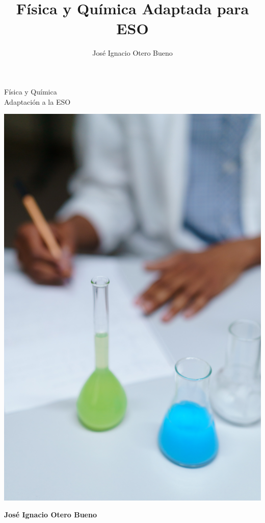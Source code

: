 \documentclass[12pt]{book}
\title{Física y Química Adaptada para ESO}
\author{José Ignacio Otero Bueno}
\begin{document}
	\begin{titlepage}
	\centering
	\Huge{Física y Química}
	\\
	\large{Adaptación a la ESO}
	\begin{center}
\includegraphics[scale=0.09]{imagenes/portada}
\end{center}
		\normalsize
		\begin{flushright}
		\textbf{José Ignacio Otero Bueno}
		\end{flushright}
	\end{titlepage}	
	
	
	
	
	
	
	
	
	
\maketitle

\tableofcontents



%
%

%


%

\nocite{*}


\end{document}
